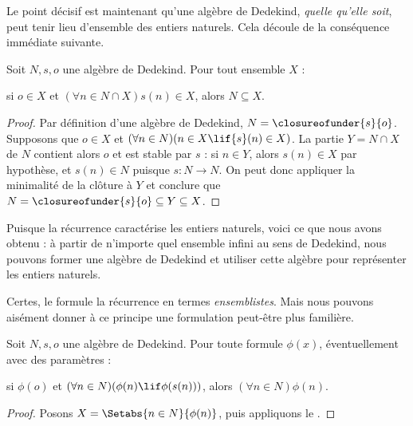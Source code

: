 \documentclass[../../../include/open-logic-section]{subfiles}
\begin{document}

Le point décisif est maintenant qu'une algèbre de Dedekind,
\emph{quelle qu'elle soit}, peut tenir lieu d'ensemble des entiers
naturels. Cela découle de la conséquence immédiate suivante.

\begin{thm}
Soit $N,s,o$ une algèbre de Dedekind. Pour tout ensemble $X$ :
	\begin{center}
		si $o \in X$ et $(\forall {n} \in N \cap X){s}({n}) \in X$,
		alors $N \subseteq X$.
	\end{center}
\end{thm}

\begin{proof}
Par définition d'une algèbre de Dedekind,
$N = \closureofunder{s}{o}$. Supposons que $o \in X$ et
$(\forall {n} \in N)(n \in X \lif {s}({n}) \in X)$.
La partie $Y=N\cap X$ de $N$ contient alors $o$ et est stable par $s$ :
si $n\in Y$, alors $s(n)\in X$ par hypothèse, et $s(n)\in N$
puisque $s\colon N\to N$. On peut donc appliquer la minimalité de la
clôture à $Y$ et conclure que $N=\closureofunder{s}{o}\subseteq Y\subseteq X$.
%
%
%
\end{proof}

Puisque la récurrence caractérise les entiers naturels, voici ce que
nous avons obtenu : à partir de n'importe quel ensemble infini au sens
de Dedekind, nous pouvons former une algèbre de Dedekind et utiliser
cette algèbre pour représenter les entiers naturels.

Certes, le  formule la récurrence
en termes \emph{ensemblistes}. Mais nous pouvons aisément donner à ce
principe une formulation peut-être plus familière.

\begin{cor}
Soit $N,s,o$ une algèbre de Dedekind. Pour toute formule $\phi(x)$,
éventuellement avec des paramètres :
\begin{center}
	si $\phi(o)$ et $(\forall {n} \in N)(\phi(n)\lif
	\phi({s}({n})))$, alors $(\forall n \in N)\phi(n)$.
\end{center}
\end{cor}

\begin{proof}
Posons $X = \Setabs{n \in N}{\phi(n)}$, puis appliquons le
.
\end{proof}
\end{document}

